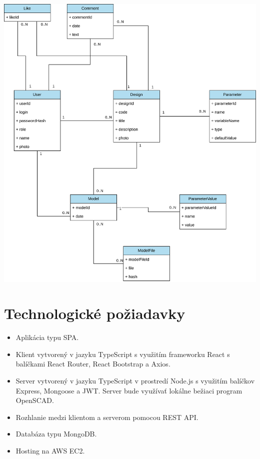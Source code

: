 \documentclass[a4paper]{article}
\begin{document}
\includegraphics[width=\linewidth]{data_model.png}


\section{Technologické požiadavky}

\begin{itemize}

\item
Aplikácia typu SPA.

\item
Klient vytvorený v jazyku TypeScript
s využitím frameworku React s balíčkami React Router, React Bootstrap a Axios.


\item
Server vytvorený v jazyku TypeScript
v prostredí Node.js
s využitím balíčkov Express, Mongoose a JWT.
Server bude využívať lokálne bežiaci program OpenSCAD.

\item
Rozhlanie medzi klientom a serverom pomocou REST API.

\item
Databáza typu MongoDB.

\item
Hosting na AWS EC2.

\end{itemize}
\end{document}
